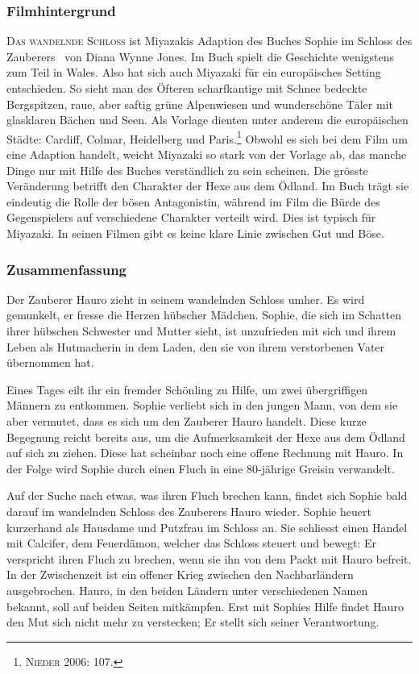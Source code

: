 \subsubsection{Filmhintergrund} 
\textsc{Das wandelnde Schloss} ist Miyazakis Adaption des Buches \glqq Sophie im Schloss des Zauberers\grqq~ von Diana Wynne Jones. Im Buch spielt die Geschichte wenigstens zum Teil in Wales. Also hat sich auch Miyazaki für ein europäisches Setting entschieden. So sieht man des Öfteren scharfkantige mit Schnee be\-deckte Bergspitzen, raue, aber saftig grüne Alpenwiesen und wunderschöne Täler mit glasklaren Bächen und Seen. Als Vorlage dienten unter anderem die europäischen Städte: Cardiff, Colmar, Heidelberg und Paris.\footnote{\textsc{Nieder} 2006: 107.} Obwohl es sich bei dem Film um eine Adaption handelt, weicht Miyazaki so stark von der Vorlage ab, das manche Dinge nur mit Hilfe des Buches verständlich zu sein scheinen. 
Die grösste Veränderung betrifft den Charakter der Hexe aus dem Ödland. Im Buch trägt sie eindeutig die Rolle der bösen Antagonistin, während im Film die Bürde des Gegenspielers auf verschiedene Charakter verteilt wird. Dies ist typisch für Miyazaki. In seinen Filmen gibt es keine klare Linie zwischen Gut und Böse. 

\subsubsection{Zusammenfassung} 
Der Zauberer Hauro zieht in seinem wandelnden Schloss umher. Es wird ge\-munkelt, er fresse die Herzen hübscher Mädchen. Sophie, die sich im Schatten ihrer hübschen Schwester und Mutter sieht, ist unzufrieden mit sich und ihrem Leben als Hutmacherin in dem Laden, den sie von ihrem verstorbenen Vater übernommen hat.

Eines Tages eilt ihr ein fremder Schönling zu Hilfe, um zwei übergriffigen Männern zu entkommen. Sophie verliebt sich in den jungen Mann, von dem sie aber vermutet, dass es sich um den Zauberer Hauro handelt. Diese kurze Begegnung reicht bereits aus, um die Aufmerksamkeit der Hexe aus dem Ödland auf sich zu ziehen. Diese hat scheinbar noch eine offene Rechnung mit Hauro. In der Folge wird Sophie durch einen Fluch in eine 80-jährige Greisin verwandelt. 

Auf der Suche nach etwas, was ihren Fluch brechen kann, findet sich Sophie bald darauf im wandelnden Schloss des Zauberers Hauro wieder. Sophie heuert kurzerhand als Hausdame und Putzfrau im Schloss an. Sie schliesst einen Handel mit Calcifer, dem Feuerdämon, welcher das Schloss steuert und bewegt: Er verspricht ihren Fluch zu brechen, wenn sie ihn von dem Packt mit Hauro befreit. In der Zwischenzeit ist ein offener Krieg zwischen den Nachbarländern ausgebrochen. Hauro, in den beiden Ländern unter verschiedenen Namen bekannt, soll auf beiden Seiten mitkämpfen. Erst mit Sophies Hilfe findet Hauro den Mut sich nicht mehr zu verstecken; Er stellt sich seiner Verantwortung. 

